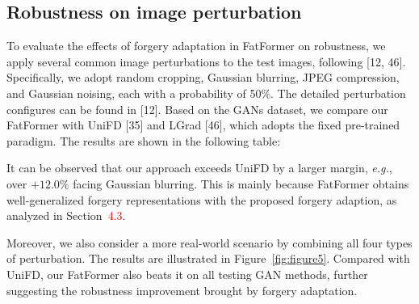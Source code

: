 \documentclass[10pt,twocolumn,letterpaper]{article}
\begin{document}
\begin{appendices}
\subsection{Robustness on image perturbation}
\label{robustness}
To evaluate the effects of forgery adaptation in FatFormer on robustness, we apply several common image perturbations to the test images, following [\textcolor{cvprblue}{12}, \textcolor{cvprblue}{46}]. Specifically, we adopt random cropping, Gaussian blurring, JPEG compression, and Gaussian noising, each with a probability of 50\%. The detailed perturbation configures can be found in [\textcolor{cvprblue}{12}]. Based on the GANs dataset, we compare our FatFormer with UniFD [\textcolor{cvprblue}{35}] and LGrad [\textcolor{cvprblue}{46}], which adopts the fixed pre-trained paradigm. The results are shown in the following table:
\begin{table}[h]
\centering
\vspace{-3mm}
\renewcommand\arraystretch{1.15}
\vspace{-3mm}
\end{table}

\noindent It can be observed that our approach exceeds UniFD by a larger margin, {\em e.g.}, over $+12.0\%$ facing Gaussian blurring. This is mainly because FatFormer obtains well-generalized forgery representations with the proposed forgery adaption, as analyzed in Section~\textcolor{red}{4.3}.

Moreover, we also consider a more real-world scenario by combining all four types of perturbation. The results are illustrated in Figure~\ref{fig:figure5}. Compared with UniFD, our FatFormer also beats it on all testing GAN methods, further suggesting the robustness improvement brought by forgery adaptation.
\end{appendices}
\end{document}
